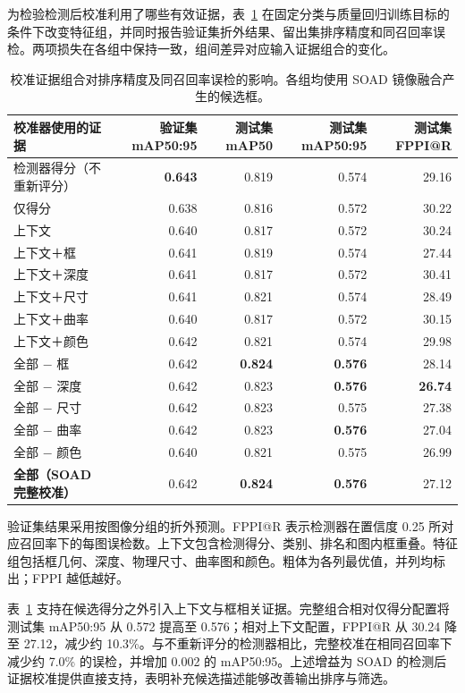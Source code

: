 \documentclass[11pt,a4paper]{ctexart}
\begin{document}
为检验检测后校准利用了哪些有效证据，表~\ref{tab:per} 在固定分类与质量回归训练目标的条件下改变特征组，并同时报告验证集折外结果、留出集排序精度和同召回率误检。两项损失在各组中保持一致，组间差异对应输入证据组合的变化。

\begin{table}[H]
\centering
\footnotesize
\caption{校准证据组合对排序精度及同召回率误检的影响。各组均使用 SOAD 镜像融合产生的候选框。}
\label{tab:per}
\begin{tabular}{lrrrr}
\toprule
校准器使用的证据 & 验证集 mAP50:95 & 测试集 mAP50 & 测试集 mAP50:95 & 测试集 FPPI@R \\
\midrule
检测器得分（不重新评分） & \textbf{0.643} & 0.819 & 0.574 & 29.16 \\
\midrule
仅得分 & 0.638 & 0.816 & 0.572 & 30.22 \\
上下文 & 0.640 & 0.817 & 0.572 & 30.24 \\
上下文＋框 & 0.641 & 0.819 & 0.574 & 27.44 \\
上下文＋深度 & 0.641 & 0.817 & 0.572 & 30.41 \\
上下文＋尺寸 & 0.641 & 0.821 & 0.574 & 28.49 \\
上下文＋曲率 & 0.640 & 0.817 & 0.572 & 30.15 \\
上下文＋颜色 & 0.642 & 0.821 & 0.574 & 29.98 \\
全部 $-$ 框 & 0.642 & \textbf{0.824} & \textbf{0.576} & 28.14 \\
全部 $-$ 深度 & 0.642 & 0.823 & \textbf{0.576} & \textbf{26.74} \\
全部 $-$ 尺寸 & 0.642 & 0.823 & 0.575 & 27.38 \\
全部 $-$ 曲率 & 0.642 & 0.823 & \textbf{0.576} & 27.04 \\
全部 $-$ 颜色 & 0.640 & 0.821 & 0.575 & 26.99 \\
\textbf{全部（SOAD 完整校准）} & 0.642 & \textbf{0.824} & \textbf{0.576} & 27.12 \\
\bottomrule
\end{tabular}
\par\vspace{2pt}\parbox{0.97\linewidth}{\footnotesize 验证集结果采用按图像分组的折外预测。FPPI@R 表示检测器在置信度 0.25 所对应召回率下的每图误检数。上下文包含检测得分、类别、排名和图内框重叠。特征组包括框几何、深度、物理尺寸、曲率图和颜色。粗体为各列最优值，并列均标出；FPPI 越低越好。}
\end{table}
表~\ref{tab:per} 支持在候选得分之外引入上下文与框相关证据。完整组合相对仅得分配置将测试集 mAP50:95 从 0.572 提高至 0.576；相对上下文配置，FPPI@R 从 30.24 降至 27.12，减少约 10.3\%。与不重新评分的检测器相比，完整校准在相同召回率下减少约 7.0\% 的误检，并增加 0.002 的 mAP50:95。上述增益为 SOAD 的检测后证据校准提供直接支持，表明补充候选描述能够改善输出排序与筛选。
\end{document}
